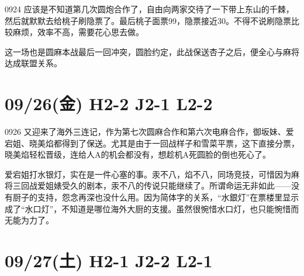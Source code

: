 0924 应该是不知道第几次圆炮合作了，自由向两家交待了一下带上东山的千棘，然后就默默去给桃子刷隐票了。最后桃子面票99，隐票接近30。不得不说刷隐票比较麻烦，效率不高，需要花心思去做。

这一场也是圆麻本战最后一回冲突，圆脸约定，此战保送杏子之后，便全心与麻将达成联盟关系。

\section{09/26(金) H2-2 J2-1 L2-2}


0926 又迎来了海外三连记，作为第七次圆麻合作和第六次电麻合作，御坂妹、爱宕姐、晓美焰都得到了保送。尤其是由于一回战样子和雪菜平票，这下直接分票，晓美焰轻松晋级，连给人A的机会都没有，想趁机A死圆脸的倒也死心了。

爱宕姐打水银灯，实在是一件心塞的事。汞不八，焰不八，同场竞技，可惜因为麻将三回战爱姐婊受久的剧本，汞不八的传说只能继续了。所谓命运无非如此——没有厨子的支持，怨念再深也没什么用。因为简体字的关系，“水銀灯”在票楼里显示成了“水口灯”，不知道是哪位海外大厨的支援。虽然很惋惜水口灯，也只能惋惜而无能为力了。

\section{09/27(土) H2-1 J2-2 L2-1}

